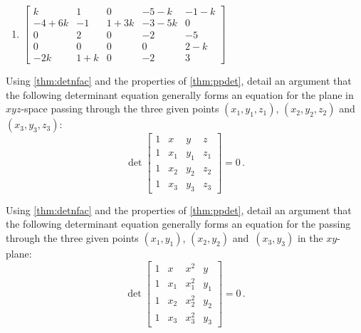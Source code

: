 \begin{exercise}
\begin{enumerate}
\item \(\begin{bmatrix} k & 1 & 0 & -5-k & -1-k
\\-4+6k & -1 & 1+3k & -3-5k & 0
\\0 & 2 & 0 & -2 & -5
\\0 & 0 & 0 & 0 & 2-k
\\-2k & 1+k & 0 & -2 & 3 \end{bmatrix}\)

\end{enumerate}
\end{exercise}






\begin{exercise}  
Using \cref{thm:detnfac} and the properties of \cref{thm:ppdet}, detail an argument that the following determinant equation generally forms an equation for the plane in \(xyz\)-space passing through the three given points \((x_1,y_1,z_1)\), \((x_2,y_2,z_2)\) and~\((x_3,y_3,z_3)\):
\begin{equation*}
\det\begin{bmatrix} 1&x&y&z
\\1&x_1&y_1&z_1
\\1&x_2&y_2&z_2
\\1&x_3&y_3&z_3 \end{bmatrix}=0\,.
\end{equation*}

\end{exercise}



\begin{exercise}  
Using \cref{thm:detnfac} and the properties of \cref{thm:ppdet}, detail an argument that the following determinant equation generally forms an equation for the  passing through the three given points \((x_1,y_1)\), \((x_2,y_2)\) and~\((x_3,y_3)\) in the \(xy\)-plane:
\begin{equation*}
\det\begin{bmatrix} 1&x&x^2&y
\\1&x_1&x_1^2&y_1
\\1&x_2&x_2^2&y_2
\\1&x_3&x_3^2&y_3 \end{bmatrix}=0\,.
\end{equation*}
\end{exercise}






